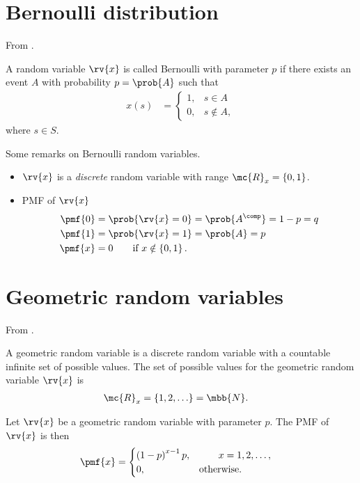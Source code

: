 \section{Bernoulli distribution}
From \cite{psaromiligkos_slides_2019}.
\begin{definitionBox}
    A random variable $\rv{x}$ is called Bernoulli with parameter $p$ if there exists an event $A$ with probability $p = \prob{A}$ such that
    \begin{align}
        x(s) &=
        \begin{cases}
            1, & s\in A\\
            0, & s\notin A,
        \end{cases}
    \end{align}
    where $s\in S$.
\end{definitionBox}
\begin{myremark}
    Some remarks on Bernoulli random variables.
    \begin{itemize}
        \item $\rv{x}$ is a \emph{discrete} random variable with range $\mc{R}_{x} = \left\{ 0, 1\right\}$.
        \item PMF of $\rv{x}$ 
        \begin{align}
            \pmf{0} &= \prob{\rv{x} = 0} = \prob{A^{\comp}} = 1 - p = q\\
            \pmf{1} &= \prob{\rv{x} = 1} = \prob{A} = p\\
            \pmf{x} &= 0 \qquad \text{if } x\notin \left\{ 0,1\right\}.
        \end{align}
    \end{itemize}
\end{myremark}

\section{Geometric random variables}
From \cite{psaromiligkos_slides_2019}.
\begin{definitionBox}
    A geometric random variable is a discrete random variable with a countable infinite set of possible values. The set of possible values for the geometric random variable $\rv{x}$ is
    \begin{align}
        \mc{R}_{x} &= \left\{ 1, 2, \ldots\right\} = \mbb{N}.
    \end{align}
\end{definitionBox}
\begin{mytheorem}
    Let $\rv{x}$ be a geometric random variable with parameter $p$. The PMF of $\rv{x}$ is then
    \begin{align}
        \pmf{x} &= 
        \begin{cases}
            \left( 1 - p \right)^{x-1}p, &\qquad x = 1, 2, \ldots,\\
            0, & \text{otherwise}.
        \end{cases}
    \end{align}
\end{mytheorem}

